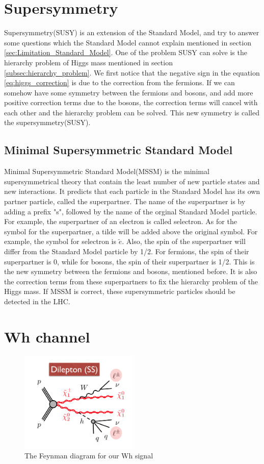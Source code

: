 \section{Supersymmetry}
Supersymmetry(SUSY) is an extension of the Standard Model, and try to answer some questions which the Standard Model cannot explain mentioned in section \ref{sec:Limitation_Standard_Model}.
One of the problem SUSY can solve is the hierarchy problem of Higgs mass mentioned in section \ref{subsec:hierarchy_problem}.
We first notice that the negative sign in the equation \ref{eq:higgs_correction} is due to the correction from the fermions.
If we can somehow have some symmetry between the fermions and bosons, and add more positive correction terms due to the bosons, the correction terms will cancel with each other and the hierarchy problem can be solved.
This new symmetry is called the supersymmetry(SUSY).

\subsection{Minimal Supersymmetric Standard Model}
Minimal Supersymmetric Standard Model(MSSM) is the minimal supersymmetrical theory that contain the least number of new particle states and new interactions.
It predicts that each particle in the Standard Model has its own partner particle, called the superpartner.
The name of the superpartner is by adding a prefix "s", followed by the name of the orginal Standard Model particle.
For example, the superpartner of an electron is called selectron.
As for the symbol for the superpartner, a tilde will be added above the original symbol.
For example, the symbol for selectron is $\tilde{e}$.
Also, the spin of the superpartner will differ from the Standard Model particle by 1/2.
For fermions, the spin of their superpartner is 0, while for bosons, the spin of their superpartner is 1/2.
This is the new symmetry between the fermions and bosons, mentioned before.
It is also the correction terms from these superpartners to fix the hierarchy problem of the Higgs mass.
If MSSM is correct, these supersymmetric particles should be detected in the LHC.

\section{Wh channel}
\label{sec:Wh_signal}
\begin{figure}
\centering
\includegraphics[width=0.5\textwidth]{data/photo/theory/signal_feynman.png}
\caption{The Feynman diagram for our Wh signal}
\label{fig:signal_feynman}
\end{figure}


